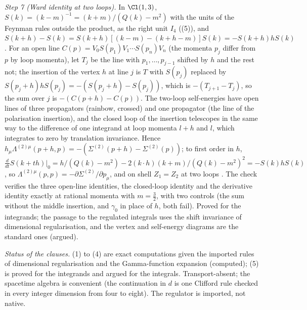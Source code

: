 \emph{Step 7 (Ward identity at two loops).} In $\Cl(1,3)$, $S(k) = (k - m)^{-1} = (k + m)/(Q(k) - m^{2})$ with the units of the Feynman rules outside the product, as the right unit $I_{4}$ ((5)), and $S(k + h) - S(k) = S(k+h)[(k - m) - (k + h - m)]S(k) = -S(k + h)hS(k)$. For an open line $C(p) = V_{0}S(p_{1})V_{1}\cdots S(p_{n})V_{n}$ (the momenta $p_{j}$ differ from $p$ by loop momenta), let $T_{j}$ be the line with $p_{1}, \ldots, p_{j-1}$ shifted by $h$ and the rest not; the insertion of the vertex $h$ at line $j$ is $T$ with $S(p_{j})$ replaced by $S(p_{j} + h)hS(p_{j}) = -(S(p_{j} + h) - S(p_{j}))$, which is $-(T_{j+1} - T_{j})$, so the sum over $j$ is $-(C(p + h) - C(p))$. The two-loop self-energies have open lines of three propagators (rainbow, crossed) and one propagator (the line of the polarisation insertion), and the closed loop of the insertion telescopes in the same way to the difference of one integrand at loop momenta $l + h$ and $l$, which integrates to zero by translation invariance. Hence $h_{\mu}\Lambda^{(2)\mu}(p + h, p) = -(\Sigma^{(2)}(p + h) - \Sigma^{(2)}(p))$; to first order in $h$, $\frac{d}{dt}S(k + th)|_{0} = h/(Q(k) - m^{2}) - 2(k\cdot h)(k + m)/(Q(k) - m^{2})^{2} = -S(k)hS(k)$, so $\Lambda^{(2)\mu}(p, p) = -\partial\Sigma^{(2)}/\partial p_{\mu}$, and on shell $Z_{1} = Z_{2}$ at two loops \cite{Ward1950}. The check verifies the three open-line identities, the closed-loop identity and the derivative identity exactly at rational momenta with $m = \tfrac32$, with two controls (the sum without the middle insertion, and $\gamma_{0}$ in place of $h$, both fail). Proved for the integrands; the passage to the regulated integrals uses the shift invariance of dimensional regularisation, and the vertex and self-energy diagrams are the standard ones (argued).

\emph{Status of the clauses.} (1) to (4) are exact computations given the imported rules of dimensional regularisation and the Gamma-function expansion (computed); (5) is proved for the integrands and argued for the integrals. Transport-absent; the spacetime algebra is convenient (the continuation in $d$ is one Clifford rule checked in every integer dimension from four to eight). The regulator is imported, not native.
